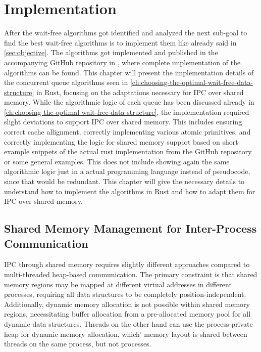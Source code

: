 \chapter{Implementation}\label{ch:implementation}

After the wait-free algorithms got identified and analyzed the next sub-goal to find the best wait-free algorithms is to implement them like already said in \cref{sec:objective}. The algorithms got implemented and published in the accompanying GitHub repository in \cite{githubMA}, where complete implementation of the algorithms can be found. This chapter will present the implementation details of the concurrent queue algorithms seen in \cref{ch:choosing-the-optimal-wait-free-data-structure} in Rust, focusing on the adaptations necessary for \ac{IPC} over shared memory. While the algorithmic logic of each queue has been discussed already in \cref{ch:choosing-the-optimal-wait-free-data-structure}, the implementation required slight deviations to support \ac{IPC} over shared memory. This includes ensuring correct cache allignment, correctly implementing various atomic primitives, and correctly implementing the logic for shared memory support based on short example snippets of the actual rust implementation from the GitHub repository or some general examples. This does not include showing again the same algorithmic logic just in a actual programming language instead of pseudocode, since that would be redundant. This chapter will give the necessary details to understand how to implement the algorithms in Rust and how to adapt them for \ac{IPC} over shared memory.

\section{Shared Memory Management for Inter-Process Communication}

\ac{IPC} through shared memory requires slightly different approaches compared to multi-threaded heap-based communication. The primary constraint is that shared memory regions may be mapped at different virtual addresses in different processes, requiring all data structures to be completely position-independent. Additionally, dynamic memory allocation is not possible within shared memory regions, necessitating buffer allocation from a pre-allocated memory pool for all dynamic data structures. Threads on the other hand can use the process-private heap for dynamic memory allocation, which' memory layout is shared between threads on the same process, but not processes.  


